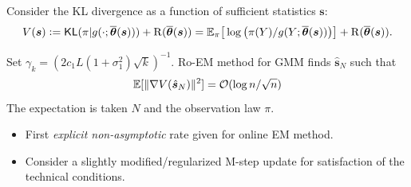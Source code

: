 \documentclass[a0,landscape]{a0poster}
\begin{document}
\begin{multicols}{3}
\begin{tcolorbox}[colback=white!5!white,colframe=red!75!black,fonttitle=\sffamily\bfseries\large,title=Analysis of the ro-EM Algorithm (Application of Case 1)]
Consider the KL divergence as a function of sufficient statistics ${\bm s}$:
{\large\[
V( {\bm s}) \eqdef {\sf KL} ( \pi | g(\cdot; \mstep{\bm s}) ) + \Pen( \mstep{\bm s}  ) =
\EE_\pi \big[ \log \big( \pi(Y) / g( Y; \mstep{\bm s} ) \big) \big] + \Pen( \mstep{\bm s}  ). \vspace{-.75cm}
\]}
\begin{coro} \vspace{-.5cm}
Set $\gamma_k = (2 c_1 L (1+\sigma_1^2) \sqrt{k})^{-1}$.
Ro-EM method for GMM finds $\hat{\bm s}_N$ such that
{\large\[
\mathbb{E} [ \| {\nabla} V( \hat{\bm s}_N ) \|^2 ] = {\cal O}( \log n / \sqrt{n} )
\]}
The expectation is taken \wrt $N$ and the observation law $\pi$.
\end{coro}
\begin{itemize}
\item First \emph{\color{red}explicit non-asymptotic} rate given for online EM method.
\item Consider a slightly modified/regularized M-step update for satisfaction of the technical conditions.
\end{itemize}
\vspace{.1cm}
\end{tcolorbox}


\end{multicols}
\end{document}
